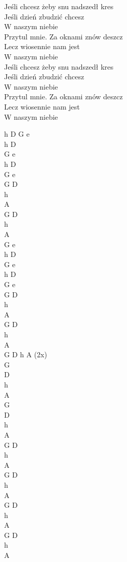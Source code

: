 \begin{text}
\vin Jeśli chcesz żeby snu nadszedł kres \\
\vin Jeśli dzień zbudzić chcesz \\
\vin W naszym niebie \\
\vin Przytul mnie. Za oknami znów deszcz \\
\vin Lecz wiosennie nam jest \\
\vin W naszym niebie \\

\vin Jeśli chcesz żeby snu nadszedł kres \\
\vin Jeśli dzień zbudzić chcesz \\
\vin W naszym niebie \\
\vin Przytul mnie. Za oknami znów deszcz \\
\vin Lecz wiosennie nam jest \\
\vin W naszym niebie \\
\end{text}
\begin{chord}
\vin h D G e\\
h D\\
G e\\
h D\\
G e\\

G D\\
h\\
A\\
G D\\
h\\
A\\
\vin G e\\

h D\\
G e\\
h D\\
G e\\

G D\\
h\\
A\\
G D\\
h\\
A\\
\vin G D h A (2x)\\

G\\
D\\
h\\
A\\

G\\
D\\
h\\
A\\

G D\\
h\\
A\\
G D\\
h\\
A\\

G D\\
h\\
A\\
G D\\
h\\
A\\
\end{chord}

